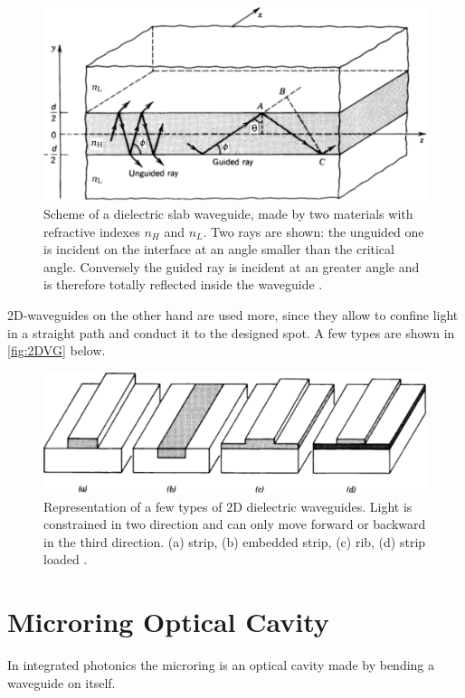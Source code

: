 \begin{figure}[ht]
	\centering
	\includegraphics[scale=.4]{figures/dielBC.pdf}
	\caption{Scheme of a dielectric slab waveguide, made by two materials with refractive indexes $n_H$ and $n_L$.
		Two rays are shown: the unguided one is incident on the interface at an angle smaller than the critical angle.
		Conversely the guided ray is incident at an greater angle and is therefore totally reflected inside the waveguide \cite{Saleh1991}.}
	\label{fig:slabVG}
\end{figure}

2D-waveguides on the other hand are used more, since they allow to confine light in a straight path and conduct it to the designed spot.
A few types are shown in \autoref{fig:2DVG} below.

\begin{figure}[ht]
	\centering
	\includegraphics[scale=.4]{figures/WGtypes.pdf}
	\caption{Representation of a few types of 2D dielectric waveguides.
		Light is constrained in two direction and can only move forward or backward in the third direction.
		(a) strip, (b) embedded strip, (c) rib, (d) strip loaded \cite{Saleh1991}.
		}
	\label{fig:2DVG}
\end{figure}

\section{Microring Optical Cavity}
\label{sec:Microring_Optical_Cavity}
In integrated photonics the microring is an optical cavity made by bending a waveguide on itself.

